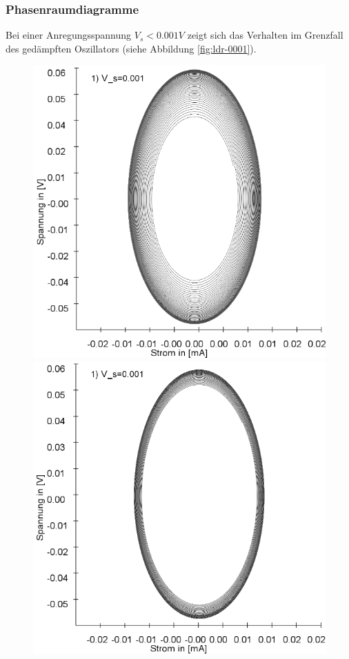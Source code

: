 \documentclass{scrartcl}
\begin{document}
\subsubsection{Phasenraumdiagramme}
Bei einer Anregungsspannung $V_s < 0.001V$ zeigt sich das Verhalten im Grenzfall des gedämpften Oszillators (siehe Abbildung \ref{fig:ldr-0001}).
\begin{figure}[!htbp]
\includegraphics[scale=0.28]{schwing-runge-nach50k-weitere200k-10-9}
\includegraphics[scale=0.28]{schwing-runge-nach100k-weitere200k-10-9}

\end{figure}
\end{document}
